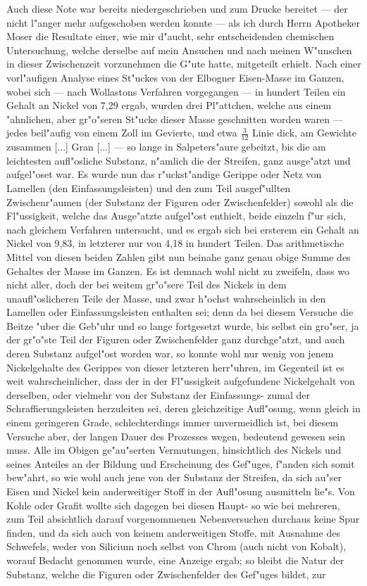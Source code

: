 \documentclass[a4paper, 11pt, oneside, german]{article}
\begin{document}
{{\hspace*{6mm}Auch diese Note war bereits niedergeschrieben und zum Drucke bereitet --- der nicht l"anger mehr aufgeschoben werden konnte --- als ich durch Herrn Apotheker Moser die Resultate einer, wie mir d"aucht, sehr entscheidenden chemischen Untersuchung, welche derselbe auf mein Ansuchen und nach meinen W"unschen in dieser Zwischenzeit vorzunehmen die G"ute hatte, mitgeteilt erhielt. Nach einer vorl"aufigen Analyse eines St"uckes von der Elbogner Eisen-Masse im Ganzen, wobei sich --- nach Wollastons Verfahren vorgegangen --- in hundert Teilen ein Gehalt an Nickel von 7,29 ergab, wurden drei Pl"attchen, welche aus einem "ahnlichen, aber gr"o"seren St"ucke dieser Masse geschnitten worden waren --- jedes beil"aufig von einem Zoll im Gevierte, und etwa $\frac{3}{12}$ Linie dick, am Gewichte zusammen [...] Gran [...] --- so lange in Salpeters"aure gebeitzt, bis die am leichtesten aufl"osliche Substanz, n"amlich die der Streifen, ganz ausge"atzt und aufgel"oset war. Es wurde nun das r"uckst"andige Gerippe oder Netz von Lamellen (den Einfassungsleisten) und den zum Teil ausgef"ullten Zwischenr"aumen (der Substanz der Figuren oder Zwischenfelder) sowohl als die Fl"ussigkeit, welche das Ausge"atzte aufgel"ost enthielt, beide einzeln f"ur sich, nach gleichem Verfahren untersucht, und es ergab sich bei ersterem ein Gehalt an Nickel von 9,83, in letzterer nur von 4,18 in hundert Teilen. Das arithmetische Mittel von diesen beiden Zahlen gibt nun beinahe ganz genau obige Summe des Gehaltes der Masse im Ganzen. Es ist demnach wohl nicht zu zweifeln, dass wo nicht aller, doch der bei weitem gr"o"sere Teil des Nickels in dem unaufl"oslicheren Teile der Masse, und zwar h"ochst wahrscheinlich in den Lamellen oder Einfassungsleisten enthalten sei; denn da bei diesem Versuche die Beitze "uber die Geb"uhr und so lange fortgesetzt wurde, bis selbst ein gro"ser, ja der gr"o"ste Teil der Figuren oder Zwischenfelder ganz durchge"atzt, und auch deren Substanz aufgel"ost worden war, so konnte wohl nur wenig von jenem Nickelgehalte des Gerippes von dieser letzteren herr"uhren, im Gegenteil ist es weit wahrscheinlicher, dass der in der Fl"ussigkeit aufgefundene Nickelgehalt von derselben, oder vielmehr von der Substanz der Einfassungs- zumal der Schraffierungsleisten herzuleiten sei, deren gleichzeitige Aufl"osung, wenn gleich in einem geringeren Grade, schlechterdings immer unvermeidlich ist, bei diesem Versuche aber, der langen Dauer des Prozesses wegen, bedeutend gewesen sein muss. Alle im Obigen ge"au"serten Vermutungen, hinsichtlich des Nickels und seines Anteiles an der Bildung und Erscheinung des Gef"uges, f"anden sich somit bew"ahrt, so wie wohl auch jene von der Substanz der Streifen, da sich au"ser Eisen und Nickel kein anderweitiger Stoff in der Aufl"osung ausmitteln lie"s. Von Kohle oder Grafit wollte sich dagegen bei diesen Haupt- so wie bei mehreren, zum Teil absichtlich darauf vorgenommenen Nebenversuchen durchaus keine Spur finden, und da sich auch von keinem anderweitigen Stoffe, mit Ausnahme des Schwefels, weder von Silicium noch selbst von Chrom (auch nicht von Kobalt), worauf Bedacht genommen wurde, eine Anzeige ergab; so bleibt die Natur der Substanz, welche die Figuren oder Zwischenfelder des Gef"uges bildet, zur }}
\end{document}
